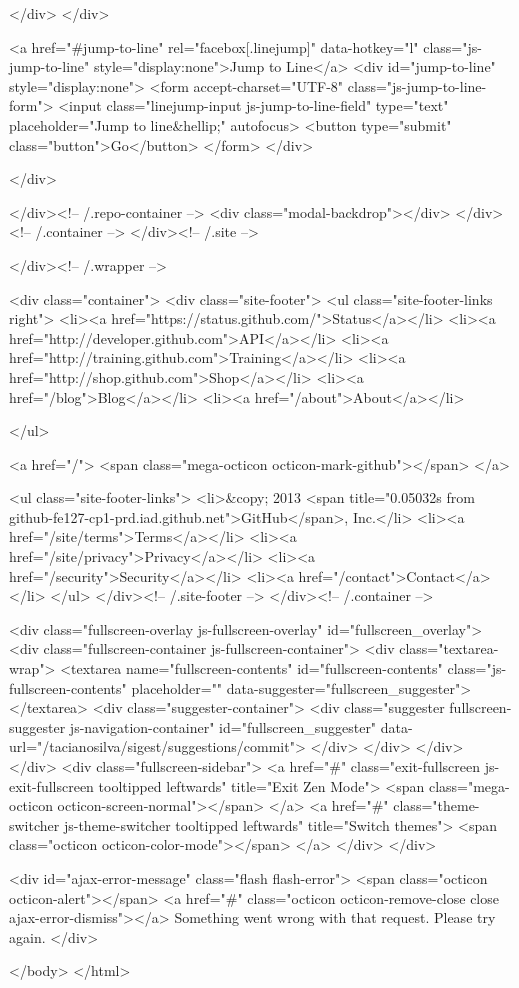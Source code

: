   </div>
</div>

<a href="#jump-to-line" rel="facebox[.linejump]" data-hotkey="l" class="js-jump-to-line" style="display:none">Jump to Line</a>
<div id="jump-to-line" style="display:none">
  <form accept-charset="UTF-8" class="js-jump-to-line-form">
    <input class="linejump-input js-jump-to-line-field" type="text" placeholder="Jump to line&hellip;" autofocus>
    <button type="submit" class="button">Go</button>
  </form>
</div>

        </div>

      </div><!-- /.repo-container -->
      <div class="modal-backdrop"></div>
    </div><!-- /.container -->
  </div><!-- /.site -->


    </div><!-- /.wrapper -->

      <div class="container">
  <div class="site-footer">
    <ul class="site-footer-links right">
      <li><a href="https://status.github.com/">Status</a></li>
      <li><a href="http://developer.github.com">API</a></li>
      <li><a href="http://training.github.com">Training</a></li>
      <li><a href="http://shop.github.com">Shop</a></li>
      <li><a href="/blog">Blog</a></li>
      <li><a href="/about">About</a></li>

    </ul>

    <a href="/">
      <span class="mega-octicon octicon-mark-github"></span>
    </a>

    <ul class="site-footer-links">
      <li>&copy; 2013 <span title="0.05032s from github-fe127-cp1-prd.iad.github.net">GitHub</span>, Inc.</li>
        <li><a href="/site/terms">Terms</a></li>
        <li><a href="/site/privacy">Privacy</a></li>
        <li><a href="/security">Security</a></li>
        <li><a href="/contact">Contact</a></li>
    </ul>
  </div><!-- /.site-footer -->
</div><!-- /.container -->


    <div class="fullscreen-overlay js-fullscreen-overlay" id="fullscreen_overlay">
  <div class="fullscreen-container js-fullscreen-container">
    <div class="textarea-wrap">
      <textarea name="fullscreen-contents" id="fullscreen-contents" class="js-fullscreen-contents" placeholder="" data-suggester="fullscreen_suggester"></textarea>
          <div class="suggester-container">
              <div class="suggester fullscreen-suggester js-navigation-container" id="fullscreen_suggester"
                 data-url="/tacianosilva/sigest/suggestions/commit">
              </div>
          </div>
    </div>
  </div>
  <div class="fullscreen-sidebar">
    <a href="#" class="exit-fullscreen js-exit-fullscreen tooltipped leftwards" title="Exit Zen Mode">
      <span class="mega-octicon octicon-screen-normal"></span>
    </a>
    <a href="#" class="theme-switcher js-theme-switcher tooltipped leftwards"
      title="Switch themes">
      <span class="octicon octicon-color-mode"></span>
    </a>
  </div>
</div>



    <div id="ajax-error-message" class="flash flash-error">
      <span class="octicon octicon-alert"></span>
      <a href="#" class="octicon octicon-remove-close close ajax-error-dismiss"></a>
      Something went wrong with that request. Please try again.
    </div>

  </body>
</html>

